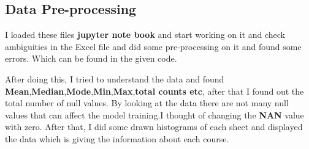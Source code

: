 \documentclass[12pt,a4paper]{article}
\begin{document}
\subsection{Data Pre-processing}
I loaded these files \textbf{jupyter note book} and start working on it and check ambiguities in the Excel file and did some pre-processing on it and found some errors. Which can be found in the given code.\par
After doing this, I tried to understand the data and found \textbf{Mean},\textbf{Median},\textbf{Mode},\textbf{Min},\textbf{Max},\textbf{total counts etc}, after that I found out the total number of null values. By looking at the data there are not many null values that can affect the model training.I thought of changing the \textbf{NAN} value with zero. After that, I did some drawn histograms of each sheet and displayed the data which is giving the information about each course.
\newpage
\end{document}
